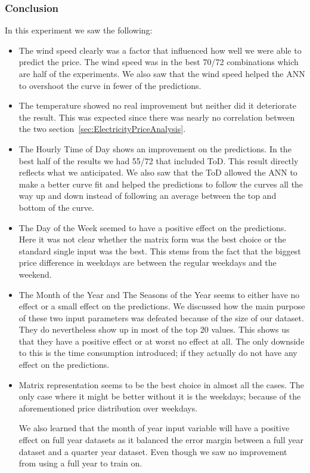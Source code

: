 \subsubsection{Conclusion}
In this experiment we saw the following:
\begin{itemize}
	\item The wind speed clearly was a factor that influenced how well we were able to predict the price. The wind speed was in the best 70/72 combinations which are half of the experiments. We also saw that the wind speed helped the ANN to overshoot the curve in fewer of the predictions.
	\item The temperature showed no real improvement but neither did it deteriorate the result. This was expected since there was nearly no correlation between the two section~\ref{sec:ElectricityPriceAnalysis}.
	\item The Hourly Time of Day shows an improvement on the predictions. In the best half of the results we had 55/72 that included ToD. This result directly reflects what we anticipated. We also saw that the ToD allowed the ANN to make a better curve fit and helped the predictions to follow the curves all the way up and down instead of following an average between the top and bottom of the curve.
	\item The Day of the Week seemed to have a positive effect on the predictions. Here it was not clear whether the matrix form was the best choice or the standard single input was the best. This stems from the fact that the biggest price difference in weekdays are between the regular weekdays and the weekend.
	\item The Month of the Year and The Seasons of the Year seems to either have no effect or a small effect on the predictions. We discussed how the main purpose of these two input parameters was defeated because of the size of our dataset. They do nevertheless show up in most of the top 20 values. This shows us that they have a positive effect or at worst no effect at all. The only downside to this is the time consumption introduced; if they actually do not have any effect on the predictions.
	\item Matrix representation seems to be the best choice in almost all the cases. The only case where it might be better without it is the weekdays; because of the aforementioned price distribution over weekdays.

We also learned that the month of year input variable will have a positive effect on full year datasets as it balanced the error margin between a full year dataset and a quarter year dataset. Even though we saw no improvement from using a full year to train on.
\end{itemize}

